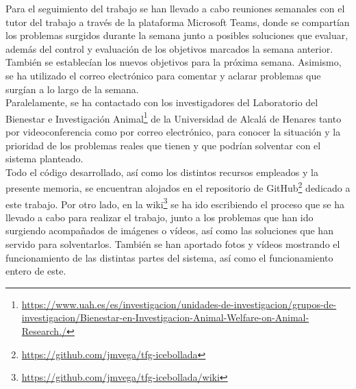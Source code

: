 Para el seguimiento del trabajo se han llevado a cabo reuniones semanales con el tutor del trabajo a través de la plataforma Microsoft Teams, donde se compartían los problemas surgidos durante la semana junto a posibles soluciones que evaluar, además del control y evaluación de los objetivos marcados la semana anterior. También se establecían los nuevos objetivos para la próxima semana. Asimismo, se ha utilizado el correo electrónico para comentar y aclarar problemas que surgían a lo largo de la semana.\\

Paralelamente, se ha contactado con los investigadores del Laboratorio del Bienestar e Investigación Animal\footnote{\url{https://www.uah.es/es/investigacion/unidades-de-investigacion/grupos-de-investigacion/Bienestar-en-Investigacion-Animal-Welfare-on-Animal-Research./}} de la Universidad de Alcalá de Henares tanto por videoconferencia como por correo electrónico, para conocer la situación y la prioridad de los problemas reales que tienen y que podrían solventar con el sistema planteado.\\

Todo el código desarrollado, así como los distintos recursos empleados y la presente memoria, se encuentran alojados en el repositorio de GitHub\footnote{\url{https://github.com/jmvega/tfg-icebollada}} dedicado a este trabajo. Por otro lado, en la wiki\footnote{\url{https://github.com/jmvega/tfg-icebollada/wiki}} se ha ido escribiendo el proceso que se ha llevado a cabo para realizar el trabajo, junto a los problemas que han ido surgiendo acompañados de imágenes o vídeos, así como las soluciones que han servido para solventarlos. También se han aportado fotos y vídeos mostrando el funcionamiento de las distintas partes del sistema, así como el funcionamiento entero de este.
